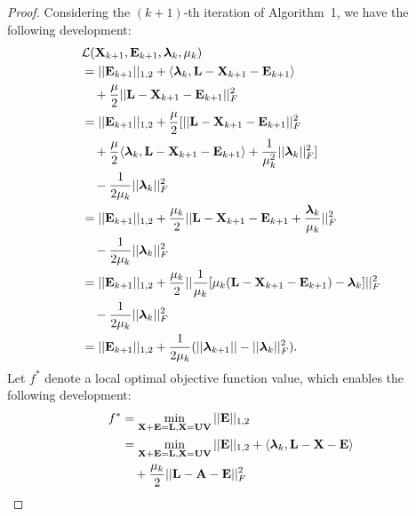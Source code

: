 \documentclass[letterpaper]{article}
\def\bA{{\bf A}}
\def\bE{{\bf E}}
\def\blambda{{\bm \lambda}}
\def\calL{{\mathcal{L}}}
\def\bL{{\bf L}}
\def\bU{{\bf U}}
\def\bV{{\bf V}}
\def\bX{{\bf X}}
\def\bA{{\bf A}}
\def\bX{{\bf X}}
\begin{document}
\begin{proof}
    Considering the $(k+1)$-th iteration of Algorithm~1, we have the following development:
    \begin{align}
    \label{eq:proof1}
      & \calL(\bX_{k+1}, \bE_{k+1}, \blambda_{k}, \mu_{k})   \nonumber \\
      & = || \bE_{k+1} ||_{1,2} + \langle \blambda_{k}, \bL - \bX_{k+1} - \bE_{k+1} \rangle  \nonumber \\
      & \quad + \frac{\mu}{2} || \bL - \bX_{k+1} - \bE_{k+1} ||_{F}^2         \nonumber \\
      & = || \bE_{k+1} ||_{1,2} + \frac{\mu}{2} [ || \bL - \bX_{k+1} - \bE_{k+1} ||_{F}^2  \nonumber \\
      & \quad + \frac{\mu}{2} \langle \blambda_{k}, \bL - \bX_{k+1} - \bE_{k+1} \rangle + \frac{1}{\mu_{k}^2} || \blambda_k ||_F^2 ] \nonumber \\
      & \quad - \frac{1}{2\mu_k} || \blambda_k ||_F^2    \nonumber  \\
      & = || \bE_{k+1} ||_{1,2} + \frac{\mu_k}{2} || \bL - \bX_{k+1} - \bE_{k+1} + \frac{\blambda_k}{\mu_k} ||_F^2 \nonumber \\
      & \quad - \frac{1}{2\mu_k} || \blambda_k ||_F^2   \nonumber \\
      & = || \bE_{k+1} ||_{1,2} + \frac{\mu_k}{2} || \frac{1}{\mu_k} [ \mu_k (\bL - \bX_{k+1} - \bE_{k+1}) - \blambda_k ] ||_F^2  \nonumber \\
      & \quad - \frac{1}{2\mu_k} || \blambda_k ||_F^2   \nonumber \\
      & = || \bE_{k+1} ||_{1,2} + \frac{1}{2\mu_k} ( || \blambda_{k+1} || - || \blambda_{k} ||_F^2 )   .
    \end{align}
    \noindent
    Let $f^*$ denote a local optimal objective function value, which enables the following development:
    \begin{align}\label{eq:proof2}
      f^* & = \min_{\bX + \bE = \bL, \bX = \bU \bV} || \bE ||_{1,2}   \nonumber  \\
          & = \min_{\bX + \bE = \bL, \bX = \bU \bV} || \bE ||_{1,2} + \langle \blambda_k, \bL - \bX - \bE \rangle \nonumber \\
          & \quad + \frac{\mu_k}{2} || \bL - \bA - \bE ||_F^2   \nonumber \\

\end{align}
\end{proof}
\end{document}
